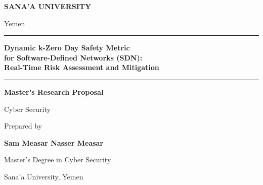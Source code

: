\documentclass[12pt,a4paper,oneside]{article}
\begin{document}
\hypersetup{pageanchor=false}
\begin{titlepage}
\thispagestyle{empty}
\begin{center}
\vspace*{1.15cm}
{\fontsize{15}{19}\selectfont\color{navy}\bfseries SANA'A UNIVERSITY}\par
\vspace{0.12cm}
{\large\color{ink} Yemen}\par
\vspace{2cm}
{\color{midblue}\rule{0.82\textwidth}{1.35pt}}\par
\vspace{0.5cm}
{\fontsize{22}{27}\selectfont\bfseries\color{navy} Dynamic k-Zero Day Safety Metric\\[0.2cm] for Software-Defined Networks (SDN):\\[0.2cm] Real-Time Risk Assessment and Mitigation}\par
\vspace{0.5cm}
{\color{midblue}\rule{0.82\textwidth}{1.35pt}}\par
\vspace{1.25cm}
{\Large\bfseries Master's Research Proposal}\par
\vspace{0.3cm}
{\normalsize Cyber Security}\par
\vfill
{\normalsize\color{accent} Prepared by}\par
\vspace{0.12cm}
{\Large\bfseries Sam Measar Nasser Measar}\par
\vspace{0.75cm}
{\normalsize Master's Degree in Cyber Security}\par
{\normalsize Sana'a University, Yemen}\par
\vspace{1.15cm}
\end{center}
\end{titlepage}
\hypersetup{pageanchor=true}
\end{document}
